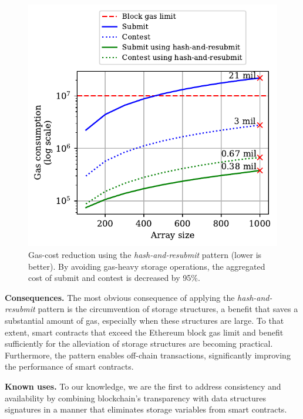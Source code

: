 \begin{figure}[!h]
\vspace*{-5mm}
\begin{center}
\includegraphics[width=0.9 \columnwidth]{figures/har-example.pdf}
\end{center}
\vspace*{-5mm}
\caption{Gas-cost reduction using the \emph{hash-and-resubmit} pattern (lower
is better). By avoiding gas-heavy storage operations, the aggregated cost of
\textsf{submit} and \textsf{contest} is decreased by 95\%.}
\label{fig:har-example}
\vspace*{-5mm}
\end{figure}

\noindent \textbf{Consequences.} The most obvious consequence of applying the
\emph{hash-and-resubmit} pattern is the circumvention of storage
structures, a benefit that saves a substantial amount of gas, especially when
these structures are large. To that extent, smart contracts that exceed the
Ethereum block gas limit and benefit sufficiently for the alleviation of
storage structures are becoming practical. Furthermore, the pattern enables
off-chain transactions, significantly improving the performance of smart
contracts.

\noindent \textbf{Known uses.} To our knowledge, we are the first to address
consistency and availability by combining blockchain's transparency with data
structures signatures in a manner that eliminates storage variables from
smart contracts.

